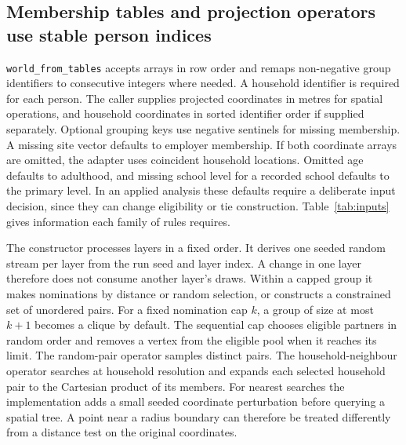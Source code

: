 \subsection{Membership tables and projection operators use stable person indices}

\texttt{world\_from\_tables} accepts arrays in row order and remaps non-negative group identifiers to consecutive integers where needed. A household identifier is required for each person. The caller supplies projected coordinates in metres for spatial operations, and household coordinates in sorted identifier order if supplied separately. Optional grouping keys use negative sentinels for missing membership. A missing site vector defaults to employer membership. If both coordinate arrays are omitted, the adapter uses coincident household locations. Omitted age defaults to adulthood, and missing school level for a recorded school defaults to the primary level. In an applied analysis these defaults require a deliberate input decision, since they can change eligibility or tie construction. Table~\ref{tab:inputs} gives information each family of rules requires.


The constructor processes layers in a fixed order. It derives one seeded random stream per layer from the run seed and layer index. A change in one layer therefore does not consume another layer's draws. Within a capped group it makes nominations by distance or random selection, or constructs a constrained set of unordered pairs. For a fixed nomination cap $k$, a group of size at most $k+1$ becomes a clique by default. The sequential cap chooses eligible partners in random order and removes a vertex from the eligible pool when it reaches its limit. The random-pair operator samples distinct pairs. The household-neighbour operator searches at household resolution and expands each selected household pair to the Cartesian product of its members. For nearest searches the implementation adds a small seeded coordinate perturbation before querying a spatial tree. A point near a radius boundary can therefore be treated differently from a distance test on the original coordinates.

